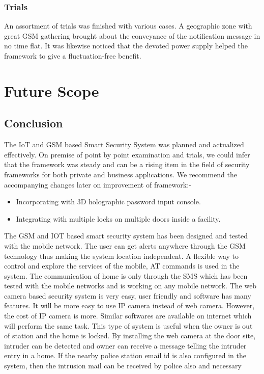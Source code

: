 \documentclass[twoside,a4paper,16pt]{book}
\begin{document}
{{			\subsection{Trials}
			An assortment of trials was finished with various cases. A geographic zone with great GSM gathering brought about the conveyance of the notification message in no time flat. It was likewise noticed that the devoted power supply helped the framework to give a fluctuation-free benefit.
			\chapter{Future Scope}
			\section{Conclusion}
			The IoT and GSM based Smart Security System was planned and actualized effectively. On premise of point by point examination and trials, we could infer that the framework was steady and can be a rising item in the field of security frameworks for both private and business applications. We recommend the accompanying changes later on improvement of framework:-
			\begin{itemize}
				\item  Incorporating with 3D holographic password input console.
				\item  Integrating with multiple locks on multiple doors inside a facility.
			\end{itemize}
			The GSM and IOT based smart security system has been designed and tested with the mobile
			network. The user can get alerts anywhere through the GSM technology thus making the
			system location independent. A flexible way to control and explore the services of the mobile,
			AT commands is used in the system. The communication of home is only through the SMS
			which has been tested with the mobile networks and is working on any mobile network.
			The web camera based security system is very easy, user friendly and software has many
			features. It will be more easy to use IP camera instead of web camera. However, the cost of IP
			camera is more. Similar softwares are available on internet which will perform the same task.
			This type of system is useful when the owner is out of station and the home is locked. By
			installing the web camera at the door site, intruder can be detected and owner can receive a
			message telling the intruder entry in a home. If the nearby police station email id is also
			configured in the system, then the intrusion mail can be received by police also and necessary
}}
\end{document}
